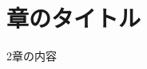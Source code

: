 \documentclass[main]{subfiles}
\begin{document}
\section{章のタイトル}
2章の内容
\\
\\
\\
\\
\\
\\
\\
\\
\end{document}
